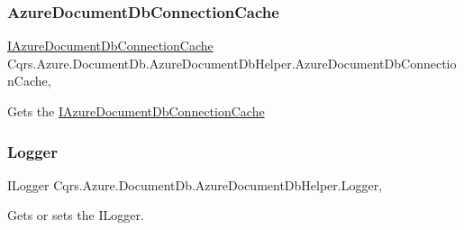 \subsubsection{\texorpdfstring{Azure\+Document\+Db\+Connection\+Cache}{AzureDocumentDbConnectionCache}}
{\footnotesize\ttfamily \hyperlink{interfaceCqrs_1_1Azure_1_1DocumentDb_1_1IAzureDocumentDbConnectionCache}{I\+Azure\+Document\+Db\+Connection\+Cache} Cqrs.\+Azure.\+Document\+Db.\+Azure\+Document\+Db\+Helper.\+Azure\+Document\+Db\+Connection\+Cache\hspace{0.3cm}{\ttfamily [get]}, {\ttfamily [protected]}}



Gets the \hyperlink{interfaceCqrs_1_1Azure_1_1DocumentDb_1_1IAzureDocumentDbConnectionCache}{I\+Azure\+Document\+Db\+Connection\+Cache} 

\mbox{\label{classCqrs_1_1Azure_1_1DocumentDb_1_1AzureDocumentDbHelper_a2943b251ec8cb01b5900607e225de45e_a2943b251ec8cb01b5900607e225de45e}} 
\subsubsection{\texorpdfstring{Logger}{Logger}}
{\footnotesize\ttfamily I\+Logger Cqrs.\+Azure.\+Document\+Db.\+Azure\+Document\+Db\+Helper.\+Logger\hspace{0.3cm}{\ttfamily [get]}, {\ttfamily [protected]}}



Gets or sets the I\+Logger. 

